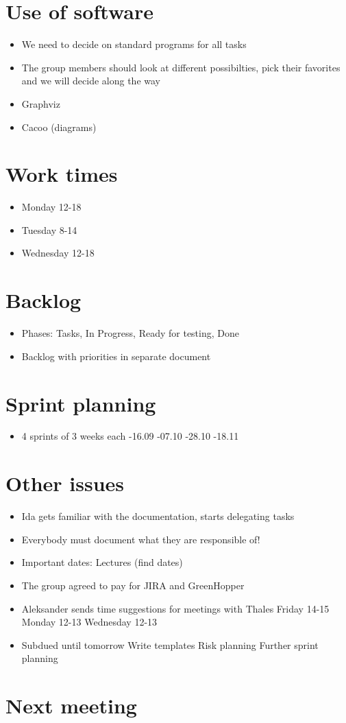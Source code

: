 \documentclass[a4paper,12pt]{article}
\begin{document}
\section{Use of software}
\begin{itemize}
\item
We need to decide on standard programs for all tasks
\item
The group members should look at different possibilties, pick their favorites and we will decide along the way
\item
Graphviz
\item
Cacoo (diagrams)
\end{itemize}
\section{Work times}
\begin{itemize}
\item
Monday 12-18
\item
Tuesday 8-14
\item
Wednesday 12-18
\end{itemize}
\section{Backlog}
\begin{itemize}
\item
Phases: Tasks, In Progress, Ready for testing, Done
\item
Backlog with priorities in separate document
\end{itemize}
\section{Sprint planning}
\begin{itemize}
\item
4 sprints of 3 weeks each
-16.09
-07.10
-28.10
-18.11
\end{itemize}
\section{Other issues}
\begin{itemize}
\item
Ida gets familiar with the documentation, starts delegating tasks
\item
Everybody must document what they are responsible of!
\item
Important dates: Lectures (find dates)
\item
The group agreed to pay for JIRA and GreenHopper
\item 
Aleksander sends time suggestions for meetings with Thales
\subitem
Friday 14-15
\subitem
Monday 12-13
\subitem
Wednesday 12-13
\item
Subdued until tomorrow
\subitem
Write templates
\subitem
Risk planning
\subitem
Further sprint planning
\end{itemize}
\section{Next meeting}
\end{document}
